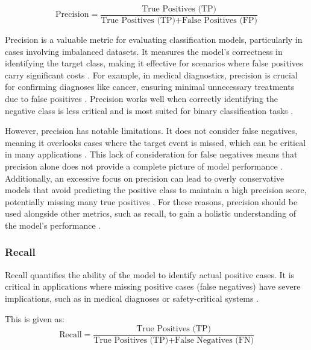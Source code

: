 \begin{equation}
    \text{Precision} = \frac{\text{True Positives (TP)}}{\text{True Positives (TP)} + \text{False Positives (FP)}}
\end{equation}

Precision is a valuable metric for evaluating classification models, particularly in cases involving imbalanced datasets. It measures the model's correctness in identifying the target class, making it effective for scenarios where false positives carry significant costs \cite{evidentlyai_accuracy_precision_recall}. For example, in medical diagnostics, precision is crucial for confirming diagnoses like cancer, ensuring minimal unnecessary treatments due to false positives \cite{appliedai_evaluation_metrics}. Precision works well when correctly identifying the negative class is less critical and is most suited for binary classification tasks \cite{bose_classification_metrics}.

However, precision has notable limitations. It does not consider false negatives, meaning it overlooks cases where the target event is missed, which can be critical in many applications \cite{evidentlyai_accuracy_precision_recall,pareto_precision_recall}. This lack of consideration for false negatives means that precision alone does not provide a complete picture of model performance \cite{pareto_precision_recall}. Additionally, an excessive focus on precision can lead to overly conservative models that avoid predicting the positive class to maintain a high precision score, potentially missing many true positives \cite{pareto_precision_recall}. For these reasons, precision should be used alongside other metrics, such as recall, to gain a holistic understanding of the model’s performance \cite{pareto_precision_recall}.

\subsubsection{Recall}
Recall quantifies the ability of the model to identify actual positive cases. It is critical in applications where missing positive cases (false negatives) have severe implications, such as in medical diagnoses or safety-critical systems \cite{article}.

This is given as: 
\begin{equation}
    \text{Recall} = \frac{\text{True Positives (TP)}}{\text{True Positives (TP)} + \text{False Negatives (FN)}}
\end{equation}


